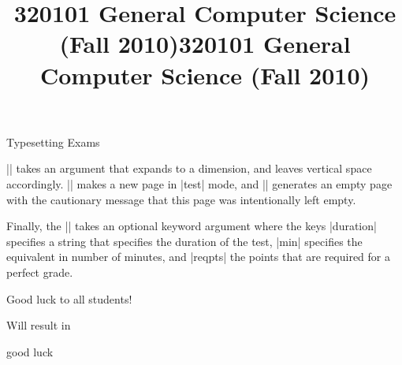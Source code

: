 \begin{sfragment}{Typesetting Exams}

\DescribeMacro{\testspace}|\testspace| takes an argument that expands to a dimension,
and leaves vertical space accordingly. \DescribeMacro{\testnewpage}|\testnewpage| makes
a new page in |test| mode, and \DescribeMacro{\testemptypage}|\testemptypage| generates
an empty page with the cautionary message that this page was intentionally left empty.

Finally, the |\testheading| takes an optional keyword argument
where the keys |duration| specifies a string that specifies the
duration of the test, |min| specifies the equivalent in number of
minutes, and |reqpts| the points that are required for a perfect
grade.

\begin{latexcode}
\title{320101 General Computer Science (Fall 2010)}
\begin{testheading}[duration=one hour,min=60,reqpts=27]
  Good luck to all students!
\end{testheading}
\end{latexcode}

Will result in
\begin{center}
  \begin{minipage}{.9\textwidth}
\makeatletter
{}
\makeatother
\title{320101 General Computer Science (Fall 2010)}
\begin{testheading}[duration=one hour,min=60,reqpts=27]
  good luck
\end{testheading}
\end{minipage}
\end{center}
\end{sfragment}



